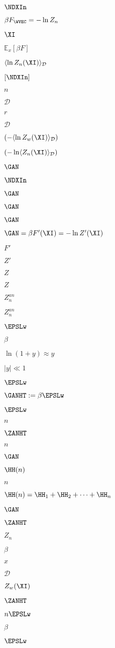 $\NDXIn$

$\beta F_{\WVEC}=-\ln Z_{n}$

$\XI$

$\mathbb{E}_{x}[\beta F]$

$\langle \ln Z_{n}(\XI)\rangle_{\mathcal{D}}$

$[\NDXIn]$

$n$

$\mathcal{D}$

$r$

$\mathcal{D}$

$(-\langle\ln Z_w(\XI)\rangle_{\mathcal{D}})$

$(-\ln \langle Z_{n}(\XI)\rangle_{\mathcal{D}})$

$\GAN$

$\NDXIn$

$\GAN$

$\GAN$

$\GAN$

$\GAN=\beta F'(\XI)=-\ln Z'(\XI)$

$F'$

$Z'$

$Z$

$Z$

$Z^{an}_{n}$

$Z^{an}_{n}$

$\EPSLw$

$\beta$

$\ln(1 + y) \approx y$

$|y| \ll 1$

$\EPSLw$

$\GANHT:=\beta \EPSLw$

$\EPSLw$

$n$

$\ZANHT$

$n$

$\GAN$

$\HH(n)$

$n$

$\HH(n)=\HH_1+\HH_2+\cdots+\HH_n$

$\GAN$

$\ZANHT$

$Z_{n}$

$\beta$

$x$

$\mathcal{D}$

$Z_w(\XI)$

$\ZANHT$

$n\EPSLw$

$\beta$

$\EPSLw$

